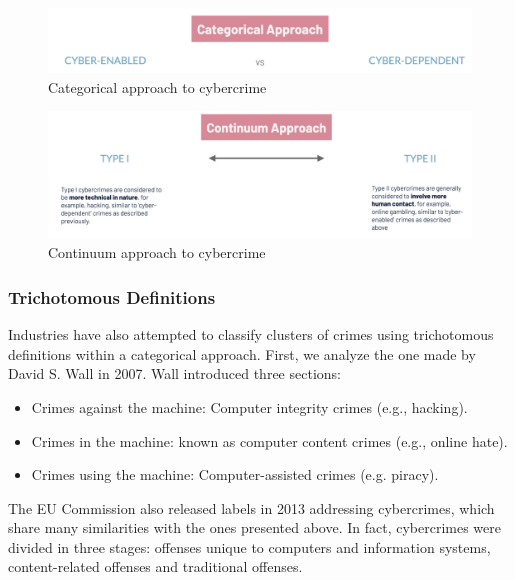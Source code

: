 \begin{multicols}{2}
    \begin{figure}[H]
        \includegraphics[width=\linewidth]{Images/Sociology/CategoricalApproach.png}
        \caption{Categorical approach to cybercrime}
    \end{figure}
    \columnbreak
    
    \begin{figure}[H]
        \includegraphics[width=\linewidth]{Images/Sociology/ContinuumApproach.png}
        \caption{Continuum approach to cybercrime}
    \end{figure}

\end{multicols}

\subsubsection{Trichotomous Definitions}
Industries have also attempted to classify clusters of crimes using trichotomous definitions within a categorical approach. First, we analyze the one made by David S. Wall in 2007. Wall introduced three sections:
\begin{itemize}
    \item Crimes against the machine: Computer integrity crimes (e.g., hacking).
    \item Crimes in the machine: known as computer content crimes (e.g., online hate).
    \item Crimes using the machine: Computer-assisted crimes (e.g. piracy).
\end{itemize}
The EU Commission also released labels in 2013 addressing cybercrimes, which share many similarities with the ones presented above. In fact, cybercrimes were divided in three stages: offenses unique to computers and information systems, content-related offenses and traditional offenses.

